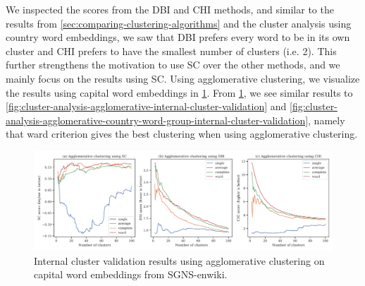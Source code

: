 We inspected the scores from the DBI and CHI methods, and similar to the results from \cref{sec:comparing-clustering-algorithms} and the cluster analysis using country word embeddings, we saw that DBI prefers every word to be in its own cluster and CHI prefers to have the smallest number of clusters (i.e. 2). This further strengthens the motivation to use SC over the other methods, and we mainly focus on the results using SC. Using agglomerative clustering, we visualize the results using capital word embeddings in \cref{fig:cluster-analysis-agglomerative-country-capitals-word-group-internal-cluster-validation}. From \cref{fig:cluster-analysis-agglomerative-country-capitals-word-group-internal-cluster-validation}, we see similar results to \cref{fig:cluster-analysis-agglomerative-internal-cluster-validation} and \cref{fig:cluster-analysis-agglomerative-country-word-group-internal-cluster-validation}, namely that ward criterion gives the best clustering when using agglomerative clustering.
\begin{figure}[H]
    \centering
    \includegraphics[width=\textwidth]{thesis/figures/cluster-analysis-agglomerative-country-capitals-word-group-internal-cluster-validation.pdf}
    \caption{Internal cluster validation results using agglomerative clustering on capital word embeddings from SGNS-enwiki.}
    \label{fig:cluster-analysis-agglomerative-country-capitals-word-group-internal-cluster-validation}
\end{figure}

